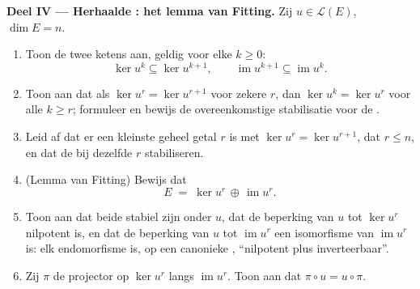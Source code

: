 \begin{problem}
\medskip
\noindent\textbf{Deel IV --- Herhaalde : het lemma van
Fitting.} Zij $u \in \mathcal{L}(E)$, $\dim E = n$.
\begin{enumerate}[resume]
  \item Toon de twee ketens aan, geldig voor elke $k \geq 0$:
        \[
        \ker u^k \subseteq \ker u^{k+1},
        \qquad
        \operatorname{im} u^{k+1} \subseteq \operatorname{im}
        u^k .
        \]
  \item Toon aan dat als $\ker u^{r} = \ker u^{r+1}$ voor zekere
        $r$, dan $\ker u^{k} = \ker u^{r}$ voor alle $k \geq r$;
        formuleer en bewijs de overeenkomstige stabilisatie voor de
        .
  \item Leid af dat er een kleinste geheel getal $r$ is met $\ker
        u^{r} = \ker u^{r+1}$, dat $r \leq n$, en dat de 
        bij dezelfde $r$ stabiliseren.
  \item (Lemma van Fitting) Bewijs dat
        \[
        E \;=\; \ker u^{r} \,\oplus\, \operatorname{im} u^{r} .
        \]
  \item Toon aan dat beide  stabiel zijn onder $u$, dat
        de beperking van $u$ tot $\ker u^{r}$ nilpotent is, en dat
        de beperking van $u$ tot $\operatorname{im} u^{r}$ een
        isomorfisme van $\operatorname{im} u^{r}$ is: elk
        endomorfisme is, op een canonieke , ``nilpotent
        plus inverteerbaar''.
  \item Zij $\pi$ de projector op $\ker u^{r}$ langs
        $\operatorname{im} u^{r}$. Toon aan dat $\pi \circ u = u
        \circ \pi$.
\end{enumerate}


\end{problem}
